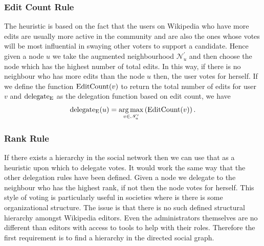 \subsubsection{Edit Count Rule}
The heuristic is based on the fact that the users on Wikipedia who have more edits are usually more active in the community and are also the ones whose votes will be most influential in swaying other voters to support a candidate. Hence given a node $u$ we take the augmented neighbourhood $\mathcal{N}_u^{\prime}$ and then choose the node which has the highest number of total edits. In this way, if there is no neighbour who has more edits than the node $u$ then, the user votes for herself. If we define the function $\operatorname*{EditCount}(v)$ to return the total number of edits for user $v$ and $\operatorname*{delegate_E}$ as the delegation function based on edit count, we have 
\[\operatorname*{delegate_E}(u)  = \operatorname*{arg\,max}_{v \in \mathcal{N}_u^\prime} \left(\operatorname*{EditCount}(v) \right).\]

\subsubsection{Rank Rule}
If there exists a hierarchy in the social network then we can use that as a heuristic upon which to delegate votes. It would work the same way that the other delegation rules have been defined. Given a node we delegate to the neighbour who has the highest rank, if not then the node votes for herself. This style of voting is particularly useful in societies where is there is some organizational structure. The issue is that there is no such defined structural hierarchy amongst Wikipedia editors. Even the administrators themselves are no different than editors with access to tools to help with their roles. Therefore the first requirement is to find a hierarchy in the directed social graph.

